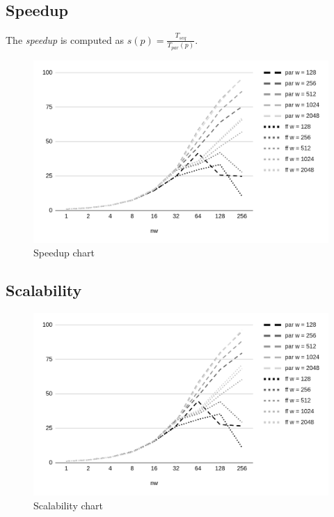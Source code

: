 \subsection{Speedup}
The \textit{speedup} is computed as $s(p) = \frac{T_{seq}}{T_{par}(p)}$.
\begin{figure}[H]
    \centering
    \includegraphics[width=\linewidth]{assets/speedup}
    \bigskip
    \caption{Speedup chart}
    \label{fig:speedup}
\end{figure}



\subsection{Scalability}
\begin{figure}[H]
    \centering
    \includegraphics[width=\linewidth]{assets/scalability}
    \bigskip
    \caption{Scalability chart}
    \label{fig:scalability}
\end{figure}



